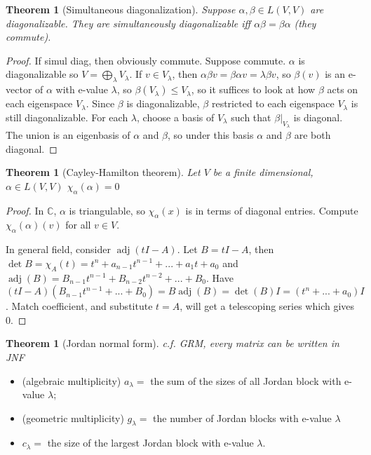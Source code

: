 \documentclass{article}
\theoremstyle{definition}
\theoremstyle{remark}
\theoremstyle{plain}
\newtheorem{thm}[defn]{Theorem}
\newcommand{\CC}{\mathbb{C}}
\begin{document}
\begin{thm}[Simultaneous diagonalization]
    Suppose $\alpha,\beta\in L(V,V)$ are diagonalizable. They are simultaneously diagonalizable iff $\alpha\beta=\beta\alpha$ (they commute).
\end{thm}
\begin{proof}
    If simul diag, then obviously commute.
    Suppose commute. $\alpha$ is diagonalizable so  $V=\bigoplus_\lambda V_\lambda$. If $v\in V_\lambda$, then $\alpha\beta v=\beta\alpha v=\lambda\beta v$, so $\beta(v)$ is an e-vector of $\alpha$ with e-value $\lambda$, so $\beta(V_\lambda)\le V_\lambda$, so it suffices to look at how $\beta$ acts on each eigenspace $V_\lambda$. Since $\beta$ is diagonalizable, $\beta$ restricted to each eigenspace $V_\lambda$ is still diagonalizable. For each $\lambda$, choose a basis of $V_\lambda$ such that $\beta|_{V_\lambda}$ is diagonal. The union is an eigenbasis of $\alpha$ and $\beta$, so under this basis $\alpha$ and $\beta$ are both diagonal.
\end{proof}
\begin{thm}[Cayley-Hamilton theorem]
Let $V$ be a finite dimensional, $\alpha\in L(V,V)$
    $\chi_\alpha(\alpha)=0$
\end{thm}
\begin{proof}
    In $\CC$, $\alpha$ is triangulable, so $\chi_\alpha(x)$ is in terms of diagonal entries. Compute $\chi_\alpha(\alpha)(v)$ for all $v\in V$.

    In general field, consider $\operatorname{adj}(tI-A)$. Let $B=tI-A$, then $\det B= \chi_A(t)=t^n+a_{n-1}t^{n-1}+...+a_1t+a_0$ and $\operatorname{adj}(B)=B_{n-1}t^{n-1}+B_{n-2}t^{n-2}+...+B_0$. Have $(tI-A)(B_{n-1}t^{n-1}+...+B_0)=B\operatorname{adj}(B)=\det(B)I=(t^n+...+a_0)I$. Match coefficient, and substitute $t=A$, will get a telescoping series which gives $0$.
\end{proof}
\begin{thm}[Jordan normal form]
c.f. GRM, every matrix can be written in JNF\\
\end{thm}
\begin{itemize}
    \item (algebraic multiplicity) $a_\lambda = $ the sum of the sizes of all Jordan block with e-value $\lambda$;
    \item (geometric multiplicity) $g_\lambda = $ the number of Jordan blocks with e-value $\lambda$
    \item $c_\lambda = $ the size of the largest Jordan block with e-value $\lambda$.
\end{itemize}
\end{document}
